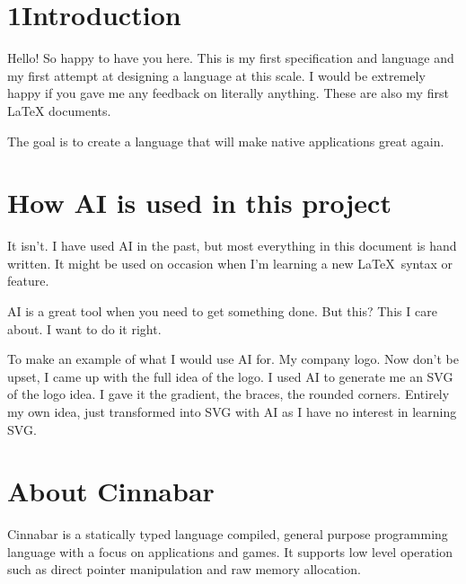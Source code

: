 
\noindent
\begin{minipage}[t]{0.56\textwidth}
    \vspace{0pt}
    \section*{1\quad Introduction}
    Hello! So happy to have you here. This is my first specification and language and my first attempt at designing a language at this scale. I would be extremely happy if you gave me any feedback on literally anything. These are also my first \LaTeX{} documents.

\vspace{1em}
The goal is to create a language that will make native applications great again.
\end{minipage}%
\hfill
\begin{minipage}[t]{0.40\textwidth}
    \vspace{-0.0em} %
    \raggedleft
    
\end{minipage}

\section{How AI is used in this project}
\para It isn't. I have used AI in the past, but most everything in this document is hand written. It might be used on occasion when I'm learning a new \LaTeX\ syntax or feature.

\para AI is a great tool when you need to get something done. But this? This I care about. I want to do it right.

\para To make an example of what I would use AI for. My company logo. Now don't be upset, I came up with the full idea of the logo. I used AI to generate me an SVG of the logo idea. I gave it the gradient, the braces, the rounded corners. Entirely my own idea, just transformed into SVG with AI as I have no interest in learning SVG.


\section{About Cinnabar}
\para Cinnabar is a statically typed language compiled, general purpose programming language with a focus on applications and games. It supports low level operation such as direct pointer manipulation and raw memory allocation.

